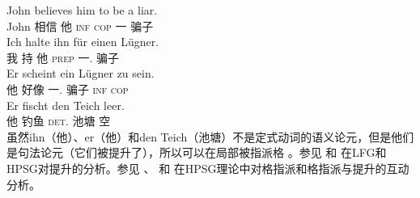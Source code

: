 \eal
\ex 
\gll John believes him to be a liar.\\
	 John 相信 他 \textsc{inf} \textsc{cop} 一 骗子\\
\ex 
\gll Ich halte ihn für einen Lügner.\\
	我 持 他 \textsc{prep} 一.\acc{} 骗子\\
\ex 
\gll Er scheint ein Lügner zu sein.\\
	 他 好像 一.\nom{} 骗子 \textsc{inf} \textsc{cop}\\
\ex 
\gll Er fischt den Teich leer.\\
	 他 钓鱼 \textsc{det}.\acc{} 池塘 空\\
\zl
虽然ihn（他）、er（他）和den Teich（池塘）不是定式动词的语义论元，但是他们是句法论元（它们被提升了），所以可以在局部被指派格 。参见 和 在LFG\indexlfgc 和HPSG\indexhpsgc 对提升的分析。参见 、 和 在HPSG理论中对格指派和格指派与提升的互动分析。

